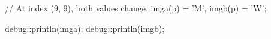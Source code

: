 // At index (9, 9), both values change.
imga(p) = 'M', imgb(p) = 'W';

debug::println(imga);
debug::println(imgb);

